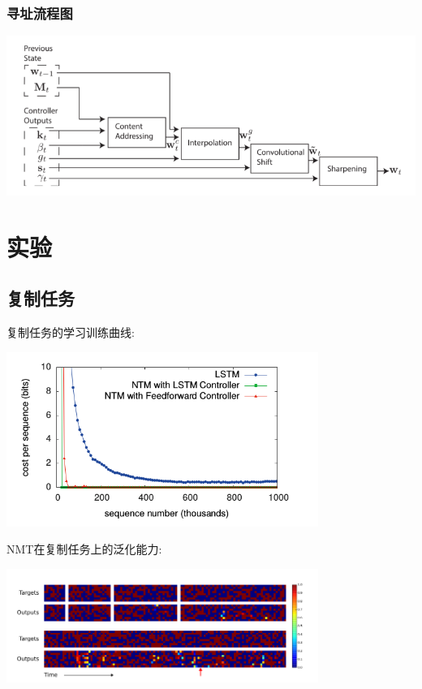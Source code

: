 \documentclass{article} %
\begin{document}
\begin{CJK*}{UTF8}{gkai}
\subsubsection{寻址流程图}
\begin{center}
\includegraphics[width=6in]{flow-diagram-of-the-addressing-mechanism.png}
\end{center}

\section{实验}
\subsection{复制任务}
复制任务的学习训练曲线:
\begin{center}
\includegraphics[width=4in]{copy-learning-curves.png}
\end{center}

NMT在复制任务上的泛化能力:
\begin{center}
\includegraphics[width=4in]{nmt-generalisation-on-the-copy-task.png}
\end{center}


\end{CJK*}
\end{document}
